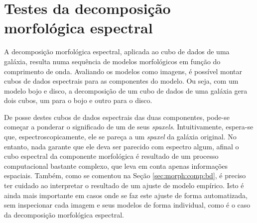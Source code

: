 


\chapter{Testes da decomposição morfológica espectral}
\label{sec:test}

A decomposição morfológica espectral, aplicada ao cubo de dados de uma galáxia,
resulta numa sequência de modelos morfológicos em função do comprimento de onda.
Avaliando os modelos como imagens, é possível montar cubos de dados espectrais
para as componentes do modelo. Ou seja, com um modelo bojo e disco, a
decomposição de um cubo de dados de uma galáxia gera dois cubos, um para o bojo
e outro para o disco.

De posse destes cubos de dados espectrais das duas componentes, pode-se começar
a ponderar o significado de um de seus {\em spaxels}. Intuitivamente, espera-se
que, espectroscopicamente, ele se pareça a um {\em spaxel} da galáxia original.
No entanto, nada garante que ele deva ser parecido com espectro algum, afinal o
cubo espectral da componente morfológica é resultado de um processo
computacional bastante complexo, que leva em conta apenas informações espaciais.
Também, como se comentou na Seção \ref{sec:morph:comp:bd}, é preciso ter cuidado
ao interpretar o resultado de um ajuste de modelo empírico. Isto é ainda mais
importante em casos onde se faz este ajuste de forma automatizada, sem
inspecionar cada imagem e seus modelos de forma individual, como é o caso da
decomposição morfológica espectral.

